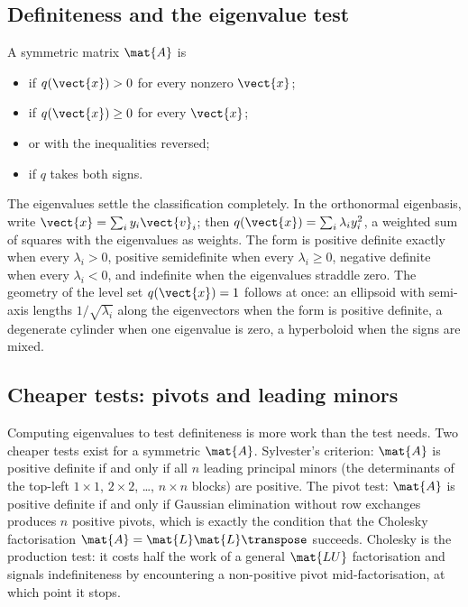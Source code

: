 \subsection{Definiteness and the eigenvalue test}

A symmetric matrix $\mat{A}$ is

\begin{itemize}[leftmargin=*]
  \item {} if $q(\vect{x}) > 0$ for every
    nonzero $\vect{x}$;
  \item {} if $q(\vect{x}) \geq 0$ for
    every $\vect{x}$;
  \item {} or  with the inequalities reversed;
  \item {} if $q$ takes both signs.
\end{itemize}

The eigenvalues settle the classification completely. In the
orthonormal eigenbasis, write $\vect{x} = \sum_{i} y_{i}
\vect{v}_{i}$; then $q(\vect{x}) = \sum_{i} \lambda_{i} y_{i}^{2}$,
a weighted sum of squares with the eigenvalues as weights. The form
is positive definite exactly when every $\lambda_{i} > 0$, positive
semidefinite when every $\lambda_{i} \geq 0$, negative definite when
every $\lambda_{i} < 0$, and indefinite when the eigenvalues
straddle zero. The geometry of the level set $q(\vect{x}) = 1$
follows at once: an ellipsoid with semi-axis lengths
$1/\sqrt{\lambda_{i}}$ along the eigenvectors when the form is
positive definite, a degenerate cylinder when one eigenvalue is
zero, a hyperboloid when the signs are mixed.

\subsection{Cheaper tests: pivots and leading minors}

Computing eigenvalues to test definiteness is more work than the
test needs. Two cheaper tests exist for a symmetric $\mat{A}$.
Sylvester's criterion: $\mat{A}$ is positive definite if and only
if all $n$ leading principal minors (the determinants of the
top-left $1 \times 1$, $2 \times 2$, \ldots, $n \times n$ blocks)
are positive. The pivot test: $\mat{A}$ is positive definite if and
only if Gaussian elimination without row exchanges produces $n$
positive pivots, which is exactly the condition that the Cholesky
factorisation $\mat{A} = \mat{L} \mat{L}\transpose$ succeeds.
Cholesky is the production test: it costs half the work of a general
$\mat{LU}$ factorisation and signals indefiniteness by encountering
a non-positive pivot mid-factorisation, at which point it stops.

